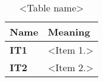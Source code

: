 %

\begin{table}
\caption{\label{<abbr:<class>}<Table name>}
\begin{tabular}{|p{1in}|p{3.5in}|}
\hline
Name & Meaning \\
\hline\hline
{\bf IT1} & <Item 1.> \\
\hline
{\bf IT2} & <Item 2.> \\
\hline
\end{tabular}
\end{table}






